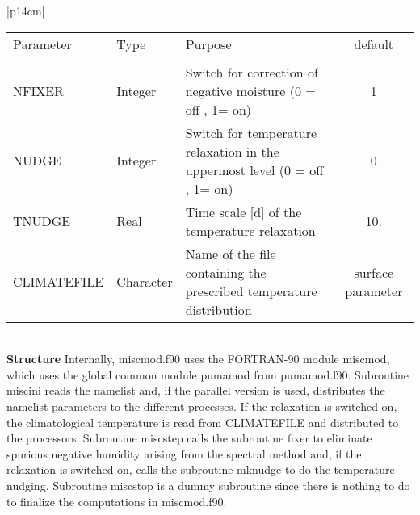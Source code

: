 \begin{center}
\begin{tabular}{|p{14cm}|}
\begin{center}
\begin{tabular}{l l p{5cm} c} %
Parameter & Type & Purpose & default \\
&&& \\
NFIXER & Integer & Switch for correction of negative moisture (0 = off , 1= on) & 1 \\
NUDGE  & Integer & Switch for temperature relaxation in the uppermost level (0 = off , 1= on)
& 0 \\
TNUDGE& Real & Time scale [d] of the temperature relaxation & 10. \\
CLIMATEFILE& Character & Name of the file containing the prescribed temperature
distribution & surface\underline{ }parameter  
\end{tabular} 
\end{center}
\vspace{3mm} \\
\hline
\vspace{2mm} {\bf Structure} Internally, {\module miscmod.f90} uses the FORTRAN-90
module {\modu miscmod}, which uses the global common module {\modu pumamod} from
{\module pumamod.f90}. Subroutine {\sub miscini} reads the namelist and, if the parallel
version is used,  distributes the namelist parameters to the different processes. If the relaxation
is
switched on, the climatological temperature is read from {\file CLIMATEFILE} and distributed
to the processors.   Subroutine {\sub miscstep} calls the subroutine {\sub fixer} to eliminate
spurious negative humidity arising from the spectral method and, if the relaxation is switched
on,
calls the subroutine {\sub mknudge} to do the temperature nudging. Subroutine {\sub miscstop}
is a dummy subroutine since there is nothing to do to finalize the computations in {\module
miscmod.f90}. \vspace{3mm} \\
\hline
\end{tabular}
\end{center} 
\newpage
\clearpage
